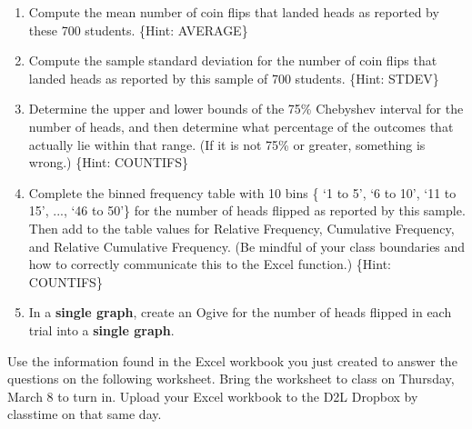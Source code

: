 \documentclass{article}
\begin{document}
\begin{enumerate}
\begin{enumerate}
	\end{enumerate}
	\item Compute the mean number of coin flips that landed heads as reported by these 700 students. \{Hint: AVERAGE\}
	\item Compute the sample standard deviation for the number of coin flips that landed heads as reported by this sample of 700 students. \{Hint: STDEV\}
	\item Determine the upper and lower bounds of the 75\% Chebyshev interval for the number of heads, and then determine what percentage of the outcomes that actually lie within that range. (If it is not 75\% or greater, something is wrong.) \{Hint: COUNTIFS\}
	\item Complete the binned frequency table with 10 bins \{ `1 to 5', `6 to 10', `11 to 15', ..., `46 to 50'\} for the number of heads flipped as reported by this sample. Then add to the table values for Relative Frequency, Cumulative Frequency, and Relative Cumulative Frequency. (Be mindful of your class boundaries and how to correctly communicate this to the Excel function.) \{Hint: COUNTIFS\}
	\item In a \textbf{single graph}, create an Ogive for the number of heads flipped in each trial into a \textbf{single graph}.
\end{enumerate}
	
\newpage
		
Use the information found in the Excel workbook you just created to answer the questions on the following worksheet. Bring the worksheet to class on Thursday, March 8 to turn in. Upload your Excel workbook to the D2L Dropbox by classtime on that same day.

\begin{center}
\textbf{}
\end{center}
\end{document}
